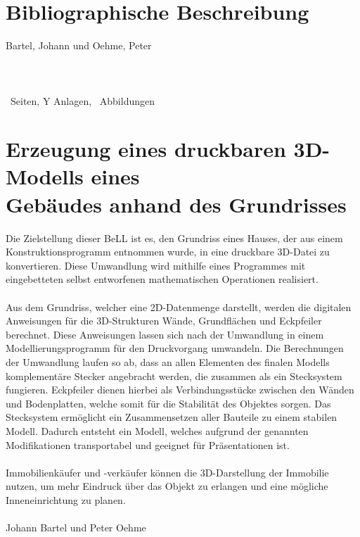 \section*{Bibliographische Beschreibung}
Bartel, Johann und Oehme, Peter\\\\
\q{\docTitle}\\\\
  \theseitennr\ Seiten, Y Anlagen, \totalfigures\ Abbildungen
 
  \newpage
 
\section*{Erzeugung eines druckbaren 3D-Modells eines \\ Gebäudes anhand des Grundrisses}
 	
 
 Die Zielstellung dieser BeLL ist es, den Grundriss eines Hauses, der aus einem Konstruktionsprogramm entnommen wurde, in eine druckbare 3D-Datei zu konvertieren.
 Diese Umwandlung wird mithilfe eines Programmes mit eingebetteten selbst entworfenen mathematischen Operationen realisiert.\\\\
 Aus dem Grundriss, welcher eine 2D-Datenmenge darstellt, werden die digitalen Anweisungen für die 3D-Strukturen Wände, Grundflächen und \mbox{Eckpfeiler} berechnet. 
 Diese Anweisungen lassen sich nach der Umwandlung in einem Modellierungsprogramm für den Druckvorgang umwandeln.
 Die Berechnungen der Umwandlung laufen so ab, dass an allen Elementen des finalen Modells komplementäre Stecker angebracht werden, die zusammen als ein Stecksystem fungieren. 
 Eckpfeiler dienen hierbei als Verbindungsstücke zwischen den Wänden und Bodenplatten, welche somit für die Stabilität des Objektes  sorgen. 
 Das Stecksystem ermöglicht ein Zusammensetzen aller Bauteile zu einem stabilen Modell. 
 Dadurch entsteht ein Modell, welches aufgrund der genannten Modifikationen transportabel und geeignet für Präsentationen ist.\\\\
 Immobilienkäufer und -verkäufer können die 3D-Darstellung der Immobilie  nutzen, um mehr Eindruck über das Objekt zu erlangen und eine mögliche Inneneinrichtung zu planen.\\\\
 Johann Bartel und Peter Oehme
